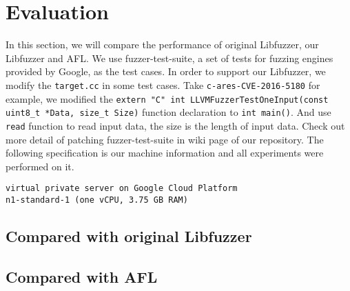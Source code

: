 
\section{Evaluation}
\label{sec:eval}

In this section, we will compare the performance of original Libfuzzer, our Libfuzzer and AFL. We use fuzzer-test-suite, a set of tests for fuzzing engines provided by Google, as the test cases. In order to support our Libfuzzer, we modify the \texttt{target.cc} in some test cases. Take \texttt{c-ares-CVE-2016-5180} for example, we modified the \texttt{extern "C" int LLVMFuzzerTestOneInput(const uint8\_t *Data, size\_t Size)} function declaration to \texttt{int main()}. And use \texttt{read} function to read input data, the size is the length of input data. Check out more detail of patching fuzzer-test-suite in wiki page of our repository. The following specification is our machine information and all experiments were performed on it.

\begin{lstlisting}
virtual private server on Google Cloud Platform
n1-standard-1 (one vCPU, 3.75 GB RAM)
\end{lstlisting}

\subsection{Compared with original Libfuzzer}


\subsection{Compared with AFL}


